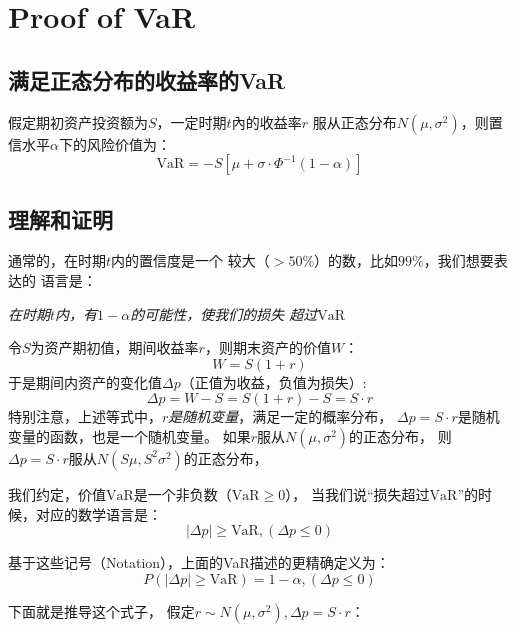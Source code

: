 \section{Proof of VaR}
\subsection{满足正态分布的收益率的VaR}
假定期初资产投资额为$S$，一定时期$t$內的收益率$r$
服从正态分布$N(\mu, \sigma^2)$，则置信水平$\alpha$下的风险价值为：
\[\text{VaR} = -S[\mu + \sigma \cdot \Phi^{-1}(1-\alpha)] \]
\subsection{理解和证明}
通常的，在时期$t$内的置信度是一个
较大（$>50\%$）的数，比如$99\%$，我们想要表达的
语言是：

\emph{在时期$t$内，有$1-\alpha$的可能性，使我们的损失
超过$\text{VaR}$}


令$S$为资产期初值，期间收益率$r$，则期末资产的价值$W$：
\[ W=S(1+r)\]
于是期间内资产的变化值$\Delta p$（正值为收益，负值为损失）:
\[ \Delta p = W-S=S(1+r)-S=S\cdot r\]
特别注意，上述等式中，\emph{$r$是随机变量}，满足一定的概率分布，
$\Delta p=S\cdot r$是随机变量的函数，也是一个随机变量。
如果$r$服从$N(\mu, \sigma^2)$的正态分布，
则$\Delta p = S\cdot r$服从$N(S\mu, S^2 \sigma^2)$的正态分布，

我们约定，价值$\text{VaR}$是一个非负数（$\text{VaR}\geq 0$），
当我们说“损失超过$\text{VaR}$”的时候，对应的数学语言是：
\[ |\Delta p| \geq \text{VaR}, (\Delta p \leq 0) \]

基于这些记号（Notation），上面的VaR描述的更精确定义为：
\begin{equation}
  P(|\Delta p| \geq \text{VaR}) = 1-\alpha, (\Delta p \leq 0)
\end{equation}

下面就是推导这个式子，
假定$r\sim N(\mu, \sigma^2), \Delta p = S\cdot r$：

